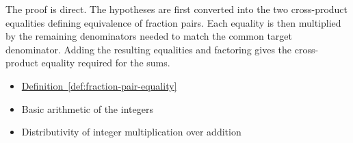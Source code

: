 \begin{remark*}
The proof is direct. The hypotheses are first converted into the two
cross-product equalities defining equivalence of fraction pairs. Each
equality is then multiplied by the remaining denominators needed to
match the common target denominator. Adding the resulting equalities
and factoring gives the cross-product equality required for the sums.
\end{remark*}

\begin{dependencies}
\begin{itemize}
  \item \hyperref[def:fraction-pair-equality]{Definition~\ref*{def:fraction-pair-equality}}
  \item Basic arithmetic of the integers
  \item Distributivity of integer multiplication over addition
\end{itemize}
\end{dependencies}
